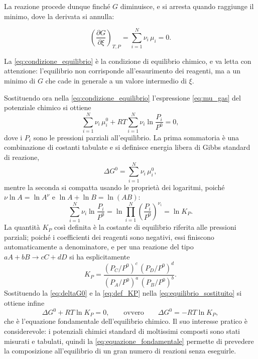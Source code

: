 La reazione procede dunque finché $G$ diminuisce, e si arresta quando raggiunge il minimo, dove la derivata si annulla:

\begin{equation}
    \left(\frac{\partial G}{\partial \xi}\right)_{T,P} = \sum_{i=1}^{N}\nu_i\,\mu_i = 0 .
    \label{eq:condizione_equilibrio}
\end{equation}

La \eqref{eq:condizione_equilibrio} è la condizione di equilibrio chimico, e va letta con attenzione: l'equilibrio non corrisponde all'esaurimento dei reagenti, ma a un minimo di $G$ che cade in generale a un valore intermedio di $\xi$.

Sostituendo ora nella \eqref{eq:condizione_equilibrio} l'espressione \eqref{eq:mu_gas} del potenziale chimico si ottiene
\begin{equation}
    \sum_{i=1}^{N}\nu_i\,\mu_i^0 + RT\sum_{i=1}^{N}\nu_i \ln\frac{P_i}{P^0} = 0 ,
    \label{eq:equilibrio_sostituito}
\end{equation}
dove i $P_i$ sono le pressioni parziali all'equilibrio.
La prima sommatoria è una combinazione di costanti tabulate e si definisce energia libera di Gibbs standard di reazione,
\begin{equation}
    \Delta G^0 = \sum_{i=1}^{N}\nu_i\,\mu_i^0 ,
    \label{eq:deltaG0}
\end{equation}
mentre la seconda si compatta usando le proprietà dei logaritmi, poiché $\nu\ln A = \ln A^{\nu}$ e $\ln A + \ln B = \ln(AB)$:
\begin{equation}
    \sum_{i=1}^{N}\nu_i \ln\frac{P_i}{P^0} = \ln \prod_{i=1}^{N}\left(\frac{P_i}{P^0}\right)^{\nu_i} = \ln K_P .
    \label{eq:def_KP}
\end{equation}
La quantità $K_P$ così definita è la costante di equilibrio riferita alle pressioni parziali; poiché i coefficienti dei reagenti sono negativi, essi finiscono automaticamente a denominatore, e per una reazione del tipo $aA + bB \rightarrow cC + dD$ si ha esplicitamente
\begin{equation}
    K_P = \frac{(P_C/P^0)^{c}\,(P_D/P^0)^{d}}{(P_A/P^0)^{a}\,(P_B/P^0)^{b}} .
    \label{eq:KP_esplicita}
\end{equation}
Sostituendo la \eqref{eq:deltaG0} e la \eqref{eq:def_KP} nella \eqref{eq:equilibrio_sostituito} si ottiene infine
\begin{equation}
    \Delta G^0 + RT\ln K_P = 0 ,
    \qquad\text{ovvero}\qquad
    \Delta G^0 = -RT\ln K_P ,
    \label{eq:equazione_fondamentale}
\end{equation}
che è l'equazione fondamentale dell'equilibrio chimico.
Il suo interesse pratico è considerevole: i potenziali chimici standard di moltissimi composti sono stati misurati e tabulati, quindi la \eqref{eq:equazione_fondamentale} permette di prevedere la composizione all'equilibrio di un gran numero di reazioni senza eseguirle.

